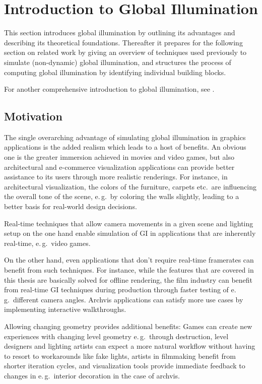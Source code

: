 \section{Introduction to Global Illumination}

This section introduces global illumination by outlining its advantages and describing its theoretical foundations. Thereafter it prepares for the following section on related work by giving an overview of techniques used previously to simulate (non-dynamic) global illumination, and structures the process of computing global illumination by identifying individual building blocks.

For another comprehensive introduction to global illumination, see \citet{Ritschel:2012:GISTAR}.

\subsection{Motivation}
The single overarching advantage of simulating global illumination in graphics applications is the added realism which leads to a host of benefits. An obvious one is the greater immersion achieved in movies and video games, but also architectural and e-commerce visualization applications can provide better assistance to its users through more realistic renderings. For instance, in architectural visualization, the colors of the furniture, carpets etc.\ are influencing the overall tone of the scene, e.\,g.\ by coloring the walls slightly, leading to a better basis for real-world design decisions.

Real-time techniques that allow camera movements in a given scene and lighting setup on the one hand enable simulation of GI in applications that are inherently real-time, e.\,g.\ video games.

On the other hand, even applications that don't require real-time framerates can benefit from such techniques. For instance, while the features that are covered in this thesis are basically solved for offline rendering, the film industry can benefit from real-time GI techniques during production through faster testing of e.\,g.\ different camera angles. Archvis applications can satisfy more use cases by implementing interactive walkthroughs.

Allowing changing geometry provides additional benefits: Games can create new experiences with changing level geometry e.\,g.\ through destruction, level designers and lighting artists can expect a more natural workflow without having to resort to workarounds like fake lights, artists in filmmaking benefit from shorter iteration cycles, and visualization tools provide immediate feedback to changes in e.\,g.\ interior decoration in the case of archvis.


